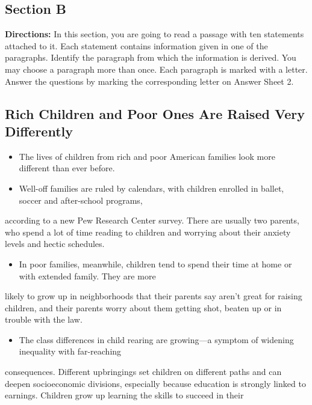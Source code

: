 \documentclass[UTF8,11pt]{ctexart}
\begin{document}
\subsection*{\textbf{Section B}}


\textbf{Directions:} In this section, you are going to read a passage with ten statements attached to it. Each statement contains information given in one of the paragraphs. Identify the paragraph from which the information is derived. You may choose a paragraph more than once. Each paragraph is marked with a letter. Answer the questions by marking the corresponding letter on Answer Sheet 2.


\subsection*{\textbf{Rich Children and Poor Ones Are Raised Very Differently}}


\begin{itemize}[leftmargin=2em,itemsep=.2em,topsep=.4em]\item[A.] The lives of children from rich and poor American families look more different than ever before.
\item[B.] Well-off families are ruled by calendars, with children enrolled in ballet, soccer and after-school programs,
\end{itemize}

according to a new Pew Research Center survey. There are usually two parents, who spend a lot of time reading to children and worrying about their anxiety levels and hectic schedules.


\begin{itemize}[leftmargin=2em,itemsep=.2em,topsep=.4em]\item[C.] In poor families, meanwhile, children tend to spend their time at home or with extended family. They are more
\end{itemize}

likely to grow up in neighborhoods that their parents say aren't great for raising children, and their parents worry about them getting shot, beaten up or in trouble with the law.


\begin{itemize}[leftmargin=2em,itemsep=.2em,topsep=.4em]\item[D.] The class differences in child rearing are growing—a symptom of widening inequality with far-reaching
\end{itemize}

consequences. Different upbringings set children on different paths and can deepen socioeconomic divisions, especially because education is strongly linked to earnings. Children grow up learning the skills to succeed in their
\end{document}

